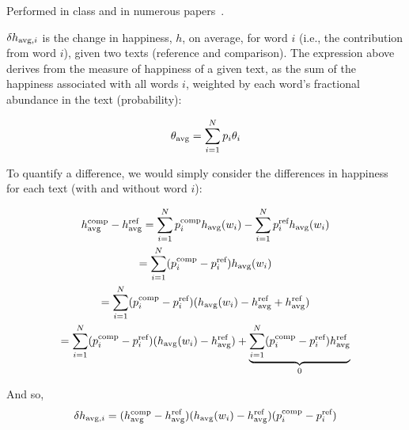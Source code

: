\begin{enumerate}
  Performed in class and in numerous papers~\cite{dodds2009c,dodds2011e,dodds2015a}.

  
   \solutionstart

   
$\delta h_{\textnormal{avg},i}$ is the change in happiness, $h$, on average, for word $i$ (i.e., the contribution from word $i$), given two texts (reference and comparison). The expression above derives from the measure of happiness of a given text, as the sum of the happiness associated with all words $i$, weighted by each word's fractional abundance in the text (probability):

\[
\theta_{\textnormal{avg}}
=
\sum_{i=1}^{N}
p_i\theta_i
\]


To quantify a difference, we would simply consider the differences in happiness for each text (with and without word $i$):

\[
\begin{gathered}
	h^{\textnormal{comp}}_{\textnormal{avg}}
	-
	h^{\textnormal{ref}}_{\textnormal{avg}}
	=
	\sum_{i=1}^{N}p_i^{\textnormal{comp}}h_{\textnormal{avg}}(w_i)
	-
	\sum_{i=1}^{N}p_i^{\textnormal{ref}}h_{\textnormal{avg}}(w_i) \\
	=
	\sum_{i=1}^{N} (p_i^{\textnormal{comp}} - p_i^{\textnormal{ref}} )h_{\textnormal{avg}}(w_i) \\
	=
	\sum_{i=1}^{N} (p_i^{\textnormal{comp}} - p_i^{\textnormal{ref}} ) (h_{\textnormal{avg}}(w_i) - h^{\textnormal{ref}}_{\textnormal{avg}} + h^{\textnormal{ref}}_{\textnormal{avg}}) \\
	=
	\sum_{i=1}^{N} (p_i^{\textnormal{comp}} - p_i^{\textnormal{ref}} ) (h_{\textnormal{avg}}(w_i) - h^{\textnormal{ref}}_{\textnormal{avg}}) + 
	\underbrace{
		\sum_{i=1}^{N} (p_i^{\textnormal{comp}} - p_i^{\textnormal{ref}} ) h^{\textnormal{ref}}_{\textnormal{avg}}
	}_{0}
\end{gathered}
\]

And so,
\[
  \delta h_{\textnormal{avg},i}
=
(h^{\textnormal{comp}}_{\textnormal{avg}} - h^{\textnormal{ref}}_{\textnormal{avg}})
(h_{\textnormal{avg}}(w_i) - h^{\textnormal{ref}}_{\textnormal{avg}})
(p_i^{\textnormal{comp}} - p_i^{\textnormal{ref}} )
\]







   \solutionend

\end{enumerate}
